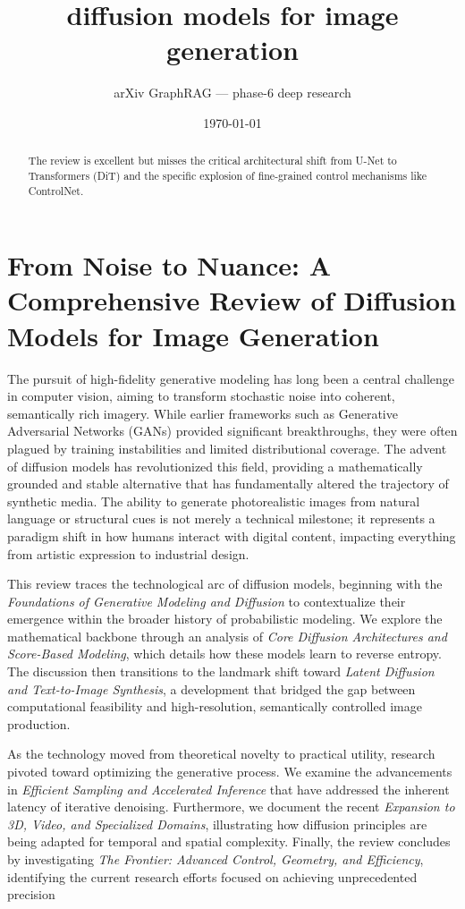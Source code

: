 \documentclass[11pt]{article}
\title{diffusion models for image generation}
\author{arXiv GraphRAG --- phase-6 deep research}
\date{\today}
\begin{document}
\maketitle

\begin{abstract}
The review is excellent but misses the critical architectural shift from U-Net to Transformers (DiT) and the specific explosion of fine-grained control mechanisms like ControlNet.
\end{abstract}

\section{From Noise to Nuance: A Comprehensive Review of Diffusion Models for Image Generation}

The pursuit of high-fidelity generative modeling has long been a central challenge in computer vision, aiming to transform stochastic noise into coherent, semantically rich imagery. While earlier frameworks such as Generative Adversarial Networks (GANs) provided significant breakthroughs, they were often plagued by training instabilities and limited distributional coverage. The advent of diffusion models has revolutionized this field, providing a mathematically grounded and stable alternative that has fundamentally altered the trajectory of synthetic media. The ability to generate photorealistic images from natural language or structural cues is not merely a technical milestone; it represents a paradigm shift in how humans interact with digital content, impacting everything from artistic expression to industrial design.

This review traces the technological arc of diffusion models, beginning with the \textit{Foundations of Generative Modeling and Diffusion} to contextualize their emergence within the broader history of probabilistic modeling. We explore the mathematical backbone through an analysis of \textit{Core Diffusion Architectures and Score-Based Modeling}, which details how these models learn to reverse entropy. The discussion then transitions to the landmark shift toward \textit{Latent Diffusion and Text-to-Image Synthesis}, a development that bridged the gap between computational feasibility and high-resolution, semantically controlled image production.

As the technology moved from theoretical novelty to practical utility, research pivoted toward optimizing the generative process. We examine the advancements in \textit{Efficient Sampling and Accelerated Inference} that have addressed the inherent latency of iterative denoising. Furthermore, we document the recent \textit{Expansion to 3D, Video, and Specialized Domains}, illustrating how diffusion principles are being adapted for temporal and spatial complexity. Finally, the review concludes by investigating \textit{The Frontier: Advanced Control, Geometry, and Efficiency}, identifying the current research efforts focused on achieving unprecedented precision
\end{document}
